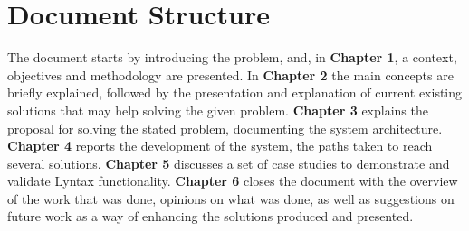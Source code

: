 \section{Document Structure}
The document starts by introducing the problem, and, in \textbf{Chapter 1}, a context, objectives and methodology are presented.
In \textbf{Chapter 2} the main concepts are briefly explained, followed by the presentation and explanation of current existing solutions that may help solving the given problem.
\textbf{Chapter 3} explains the proposal for solving the stated problem, documenting the system architecture.
\textbf{Chapter 4} reports the development of the system, the paths taken to reach several solutions.
\textbf{Chapter 5} discusses a set of case studies to demonstrate and validate Lyntax functionality.
\textbf{Chapter 6} closes the document with the overview of the work that was done, opinions on what was done, as well as suggestions on future work as a way of enhancing the solutions
produced and presented.
